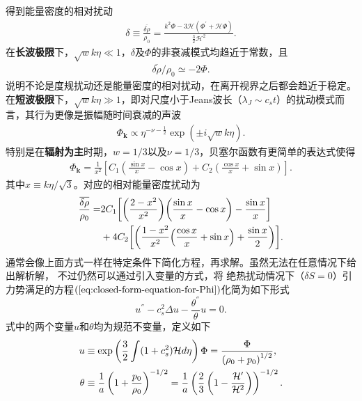 得到能量密度的相对扰动
\begin{align}
  \label{eq:gauge-invariant-relative-energy-density-perturbation}
  \delta\equiv\frac{\overline{\delta\rho}}{\rho_0}
  =\frac{k^2 \Phi -3\mathcal{H}{\left(\Phi^\prime+\mathcal{H}\Phi\right)}}{\frac{3}{2}\mathcal{H}^2}.
\end{align}
在\textbf{长波极限}下，$\sqrt{w}k\eta\ll
1$，$\delta$及$\Phi$的非衰减模式均趋近于常数，且
\begin{align}
  \overline{\delta\rho} /\rho_0\simeq -2\Phi.
\end{align}
说明不论是度规扰动还是能量密度的相对扰动，在离开视界之后都会趋近于稳定。\\
在\textbf{短波极限}下，$\sqrt{w}k\eta\gg 1$，即对尺度小于Jeans波长（$\lambda_{J}\sim
c_{s}t$）的扰动模式而言，其行为更像是振幅随时间衰减的声波
\begin{align}
  \Phi_{\mathbf{k}}\propto \eta^{-\nu-\frac{1}{2}}\exp{\left(\pm
  i\sqrt{w}k\eta\right)}. 
\end{align}
特别是在\textbf{辐射为主}时期，$w=1 /3$以及$\nu=1
/3$，贝塞尔函数有更简单的表达式使得
\begin{align}
  \label{eq:Phi-in-radiation-dominated}
  \Phi_{\mathbf{k}}=\frac{1}{x^2}{\left[
  C_1{\left(\frac{\sin x}{x}-\cos x\right)}+
  C_2{\left(\frac{\cos x}{x}+\sin x\right)}\right]}.
\end{align}
其中$x\equiv k\eta /\sqrt{3}$。对应的相对能量密度扰动为
\begin{align}
  \frac{\overline{\delta\rho}}{\rho_0}=
  &2C_1{\left[{\left(\frac{2-x^2}{x^2}\right)}{\left(\frac{\sin x}{x}-\cos
  x\right)}-\frac{\sin x}{x}\right]} \notag
  \\
  &+4C_2{\left[{\left(\frac{1-x^2}{x^2}{\left(\frac{\cos x}{x}+\sin x\right)}+\frac{\sin x}{2}\right)}\right]}.
\end{align}
通常会像上面方式一样在特定条件下简化方程，再求解。虽然无法在任意情况下给出解析解，
不过仍然可以通过引入变量的方式，将
绝热扰动情况下（$\delta S=0$）引力势满足的方程$(\ref{eq:closed-form-equation-for-Phi})$化简为如下形式
\begin{equation}
  \label{eq:ms-like-bardeen-equation}
  u^{\dprime}-c_{s}^2\Delta u - \frac{\theta^{\dprime}}{\theta} u = 0. 
\end{equation}
式中的两个变量$u$和$\theta$均为规范不变量，定义如下
\begin{align}
  \label{eq:u-theta-defininition}
  u &\equiv \exp\left(\frac{3}{2}\int (1+c_{s}^2)\mathcal{H}d\eta\right)\Phi 
      =\frac{\Phi}{\left(\rho_0+p_0\right)^{1 /2}}, \\
  \theta &\equiv \frac{1}{a}\left(1+\frac{p_0}{\rho_0}\right)^{-1 /2}=
  \frac{1}{a}\left(\frac{2}{3}\left(1-\frac{\mathcal{H^\prime}}{\mathcal{H}^2}\right)\right)^{-1
  /2}.
\end{align}

